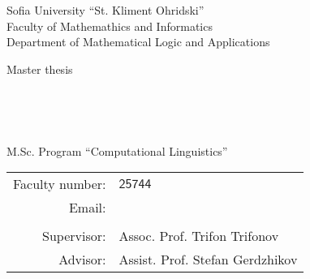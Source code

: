 \documentclass[main.tex]{subfiles}
\begin{document}
\begin{center}
    Sofia University ``St. Kliment Ohridski'' \\
    Faculty of Mathemathics and Informatics \\
    Department of Mathematical Logic and Applications
    \vspace{4cm}

    {\LARGE Master thesis} \\

    \vspace{1cm}

    {\huge \thetitle} \\

    \vspace{2cm}

    {\LARGE \theauthor} \\

    \vspace{5mm}

    {\large M.Sc. Program ``Computational Linguistics''} \\

    \vspace{3mm}

    \begin{tabular}{r l}
        Faculty number: & $\mathsf{25744}$ \\
        Email: & \code{\theemail} \\

    \vspace{1cm} \\
        \large Supervisor: & \large Assoc. Prof. Trifon Trifonov \\
        \large Advisor: & \large Assist. Prof. Stefan Gerdzhikov \\
    \end{tabular}

    \vspace{4cm}

    {\large \thedate}
\end{center}
\thispagestyle{empty}

\pagebreak
\printtoc
\pagebreak
\end{document}
